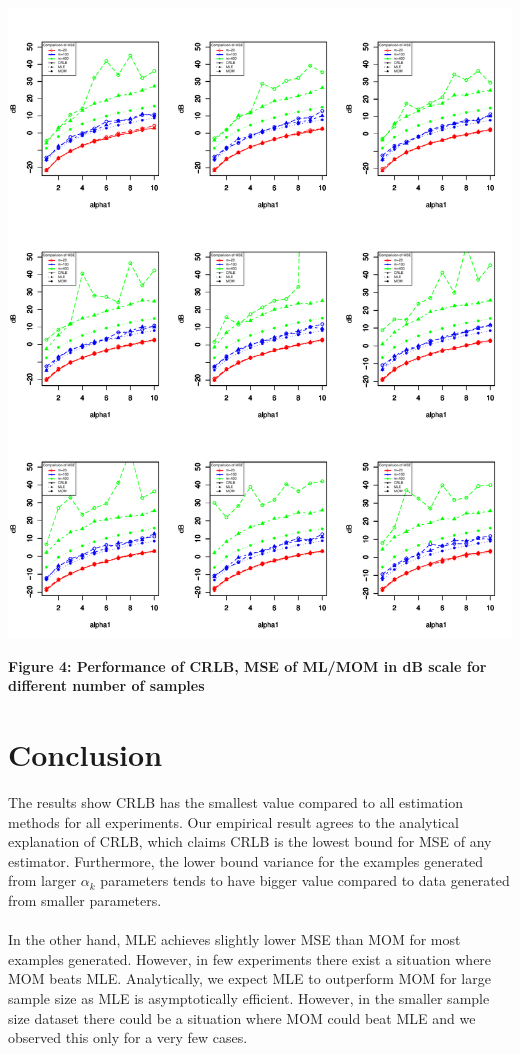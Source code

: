 \documentclass{article} %
\newcommand{\?}{\stackrel{?}{=}}
\begin{document}
\includegraphics[scale=0.8]{plt_compare_all2.pdf}
\begin{center}
\textbf{Figure 4: Performance of CRLB, MSE of ML/MOM in dB scale for different number of samples}
\end{center}

\section{Conclusion}
The results show CRLB has the smallest value compared to all estimation methods for all experiments. Our empirical result agrees to the analytical explanation of CRLB, which claims CRLB is the lowest bound for MSE of any estimator. Furthermore, the lower bound variance for the examples generated from larger $\alpha_k$ parameters tends to have bigger value compared to data generated from smaller parameters.\\
\\
In the other hand, MLE achieves slightly lower MSE than MOM for most examples generated. However, in few experiments there exist a situation where MOM beats MLE. Analytically, we expect MLE to outperform MOM for large sample size as MLE is asymptotically efficient. However, in the smaller sample size dataset there could be a situation where MOM could beat MLE and we observed this only for a very few cases.
\end{document}

